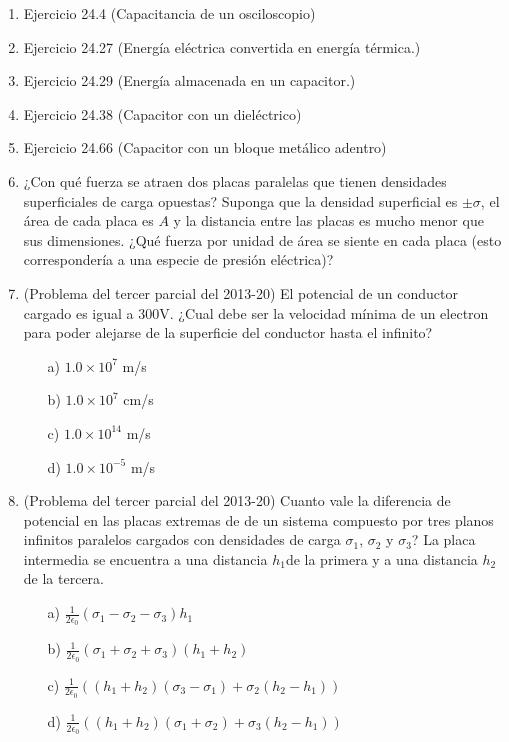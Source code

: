 \documentclass{article}
\begin{document}
\begin{enumerate}

\item
Ejercicio 24.4 (Capacitancia de un osciloscopio)

\item
Ejercicio 24.27 (Energ\'ia el\'ectrica convertida en energ\'ia t\'ermica.)

\item
Ejercicio 24.29 (Energ\'ia almacenada en un capacitor.)

\item
Ejercicio 24.38 (Capacitor con un diel\'ectrico)

\item
Ejercicio 24.66 (Capacitor con un bloque met\'alico adentro)

\item ¿Con qu\'e fuerza se atraen dos placas paralelas que tienen densidades superficiales de carga opuestas? Suponga que la densidad superficial es $\pm \sigma$, el \'area de cada placa es $A$ y la distancia entre las placas es mucho menor que sus dimensiones. ¿Qué fuerza por unidad de área se siente en cada placa (esto correspondería a una especie de presión eléctrica)?

\item  (Problema del tercer parcial del 2013-20) El potencial de un conductor cargado es igual a
  300V. ¿Cual debe ser la velocidad m\'inima de un electron para poder
  alejarse de la superficie del conductor hasta el infinito?
\begin{enumerate}
\item[a)] $1.0\times 10^7$ m/s
\item[b)] $1.0\times 10^7$ cm/s
\item[c)] $1.0\times 10^{14}$ m/s
\item[d)] $1.0\times 10^{-5}$ m/s
\end{enumerate}


\item (Problema del tercer parcial del 2013-20) Cuanto vale la diferencia de potencial en las placas
  extremas de de un sistema compuesto por tres planos infinitos
  paralelos cargados con densidades de carga $\sigma_1$, $\sigma_2$ y
  $\sigma_3$? La placa intermedia se encuentra a una distancia
  $h_1$de la primera y a una distancia $h_2$ de la tercera. 

\begin{enumerate}
\item[a)] $\frac{1}{2\epsilon_0} (\sigma_1 -\sigma_2 -\sigma_3) h_1$ 
\item[b)] $\frac{1}{2\epsilon_0} (\sigma_1 +\sigma_2 + \sigma_3)
  (h_1+h_2)$ 
\item[c)] $\frac{1}{2\epsilon_0}((h_1 + h_2) (\sigma_3-\sigma_1) +
  \sigma_2(h_2-h_1))$ 
\item[d)] $\frac{1}{2\epsilon_0} ((h_1 + h_2)(\sigma_1 + \sigma_2) +
  \sigma_3(h_2-h_1))$ 
\end{enumerate}



\end{enumerate}
\end{document}

